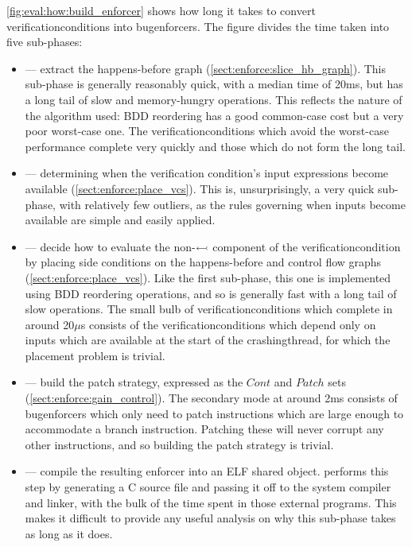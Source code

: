 \noindent
\autoref{fig:eval:how:build_enforcer} shows how long it takes to
convert \glspl{verificationcondition} into \glspl{bugenforcer}.  The
figure divides the time taken into five sub-phases:
\begin{itemize}
\item {} --- extract the happens-before graph
  (\autoref{sect:enforce:slice_hb_graph}).  This sub-phase is generally
  reasonably quick, with a median time of 20ms, but has a long tail of
  slow and memory-hungry operations.  This reflects the nature of the
  algorithm used: BDD reordering has a good common-case cost but a
  very poor worst-case one.  The \glspl{verificationcondition} which
  avoid the worst-case performance complete very quickly and those
  which do not form the long tail.
\item {} --- determining when the verification condition's
  input expressions become available
  (\autoref{sect:enforce:place_vcs}).  This is, unsurprisingly, a very
  quick sub-phase, with relatively few outliers, as the rules governing
  when inputs become available are simple and easily applied.
\item {} --- decide how to evaluate the
  non-$\leftarrowtail$ component of the
  \gls{verificationcondition} by placing \glspl{side condition} on the
  happens-before and control flow graphs
  (\autoref{sect:enforce:place_vcs}).  Like the first sub-phase, this one
  is implemented using BDD reordering operations, and so is generally
  fast with a long tail of slow operations.  The small bulb of
  \glspl{verificationcondition} which complete in around 20$\mu$s
  consists of the \glspl{verificationcondition} which depend only on
  inputs which are available at the start of the \gls{crashingthread},
  for which the placement problem is trivial.
\item {} --- build the patch strategy, expressed as the
  $\mathit{Cont}$ and $\mathit{Patch}$ sets
  (\autoref{sect:enforce:gain_control}).  The secondary mode at around
  2ms consists of \glspl{bugenforcer} which only need to patch
  instructions which are large enough to accommodate a branch
  instruction.  Patching these will never corrupt any other
  instructions, and so building the patch strategy is trivial.
\item {} --- compile the resulting enforcer into an ELF shared
  object.  {\Implementation} performs this step by generating a C
  source file and passing it off to the system compiler and linker,
  with the bulk of the time spent in those external programs.  This
  makes it difficult to provide any useful analysis on why this sub-phase
  takes as long as it does.
\end{itemize}
